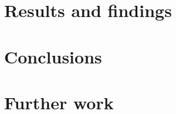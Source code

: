 \documentclass[10pt,oneside]{article}
\begin{document}
\section{Results and findings}
\label{sec:results}


\section{Conclusions}


\section{Further work}







\nocite{*}

\end{document}
